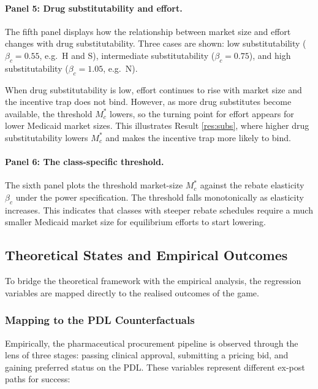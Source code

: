 \documentclass[12pt]{article}
\begin{document}
\paragraph{Panel 5: Drug substitutability and effort.}
The fifth panel displays how the relationship between market size and effort changes with drug substitutability. Three cases are shown: low substitutability ($\beta_c = 0.55$, e.g.\ H and S), intermediate substitutability ($\beta_c = 0.75$), and high substitutability ($\beta_c = 1.05$, e.g.\ N).

When drug substitutability is low, effort continues to rise with market size and the incentive trap does not bind. However, as more drug substitutes become available, the threshold $M_c^*$ lowers, so the turning point for effort appears for lower Medicaid market sizes. This illustrates Result \ref{res:subs}, where higher drug substitutability lowers $M_c^*$ and makes the incentive trap more likely to bind.

\paragraph{Panel 6: The class-specific threshold.}
The sixth panel plots the threshold market-size $M_c^*$ against the rebate elasticity $\beta_c$ under the power specification. The threshold falls monotonically as elasticity increases. This indicates that classes with steeper rebate schedules require a much smaller Medicaid market size for equilibrium efforts to start lowering.

\subsection{Theoretical States and Empirical Outcomes}

To bridge the theoretical framework with the empirical analysis, the regression variables are mapped directly to the realised outcomes of the game.

\subsubsection{Mapping to the PDL Counterfactuals}

Empirically, the pharmaceutical procurement pipeline is observed through the lens of three stages: passing clinical approval, submitting a pricing bid, and gaining preferred status on the PDL. These variables represent different ex-post paths for success:
\end{document}
